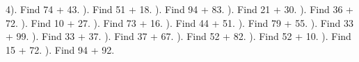 \documentclass{article}%
\begin{document}
4). Find 74 + 43.%
\newline%
\newline%
). Find 51 + 18.%
\newline%
\newline%
). Find 94 + 83.%
\newline%
\newline%
). Find 21 + 30.%
\newline%
\newline%
). Find 36 + 72.%
\newline%
\newline%
). Find 10 + 27.%
\newline%
\newline%
). Find 73 + 16.%
\newline%
\newline%
). Find 44 + 51.%
\newline%
\newline%
). Find 79 + 55.%
\newline%
\newline%
). Find 33 + 99.%
\newline%
\newline%
). Find 33 + 37.%
\newline%
\newline%
). Find 37 + 67.%
\newline%
\newline%
). Find 52 + 82.%
\newline%
\newline%
). Find 52 + 10.%
\newline%
\newline%
). Find 15 + 72.%
\newline%
\newline%
). Find 94 + 92.%
\newline%
\end{document}
